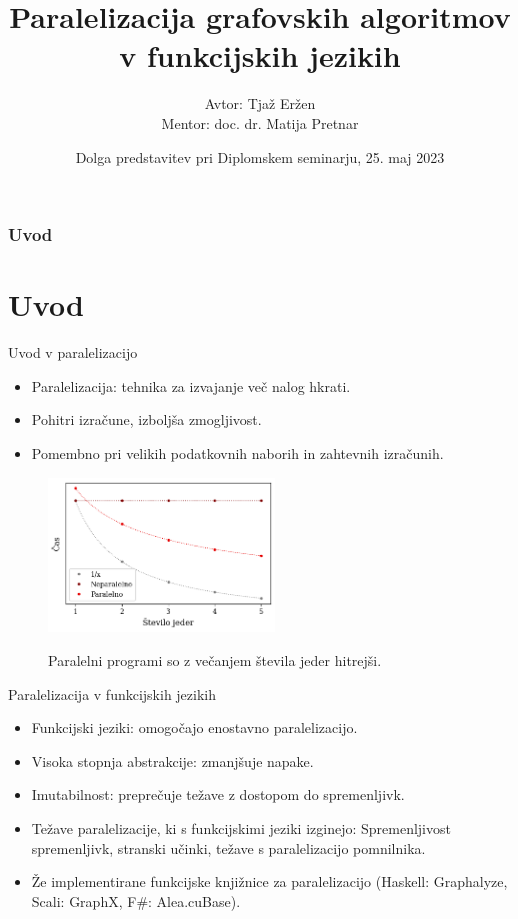 \documentclass{beamer}
\title[Paralelizacija grafovskih algoritmov v funkcijskih jezikih]
{Paralelizacija grafovskih algoritmov v funkcijskih jezikih}
\author[Avtor: Tjaž Eržen, Mentor: doc. dr. Matija Pretnar]
{Avtor: Tjaž Eržen\\Mentor: doc. dr. Matija Pretnar}
\date[25. maj 2023]
{Dolga predstavitev pri Diplomskem seminarju, 25. maj 2023}
\begin{document}
\begin{frame}
  \titlepage
\end{frame}

\begin{frame}
  \frametitle{Uvod}
  \tableofcontents
\end{frame}

\section{Uvod}

\begin{frame}{Uvod v paralelizacijo}
    \begin{itemize}
        \item Paralelizacija: tehnika za izvajanje več nalog hkrati.
        \item Pohitri izračune, izboljša zmogljivost.
        \item Pomembno pri velikih podatkovnih naborih in zahtevnih izračunih.
    \end{itemize}
    \begin{figure}
        \caption{Paralelni programi so z večanjem števila jeder hitrejši.}
        \includegraphics[width=6cm]{slike/cilj-casovne-zahtevnosti-paralelizacije.png}
        \label{fig:cilj-casovne-zahtevnosti-paralelizacije}
    \end{figure}
\end{frame}


\begin{frame}{Paralelizacija v funkcijskih jezikih}
    \begin{itemize}
        \item Funkcijski jeziki: omogočajo enostavno paralelizacijo.
        \item Visoka stopnja abstrakcije: zmanjšuje napake.
        \item Imutabilnost: preprečuje težave z dostopom do spremenljivk.
        \item Težave paralelizacije, ki s funkcijskimi jeziki izginejo: Spremenljivost spremenljivk, stranski učinki, težave s paralelizacijo pomnilnika.
        \item Že implementirane funkcijske knjižnice za paralelizacijo (Haskell: Graphalyze, Scali: GraphX, F\#: Alea.cuBase).
    \end{itemize}
\end{frame}
\end{document}
